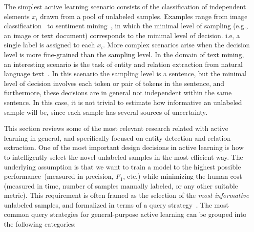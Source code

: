 The simplest active learning scenario consists of  the classification of independent elements $x_i$ drawn from a pool of unlabeled samples.
Examples range from image classification~\cite{Gal2017DeepBA} to sentiment mining~\cite{Kranjc2015ActiveLF},  in which the minimal level of sampling (e.g., an image or text document) corresponds to the minimal level of decision. i.e, a single label is assigned to each $x_i$. More complex scenarios arise when the decision level is more fine-grained than the sampling level. In the domain of text mining, an interesting scenario is the task of entity and relation extraction from natural language text~\cite{zhang2012unified}.
In this scenario the sampling level is a sentence, but the minimal level of decision involves each token or pair of tokens in the sentence, and furthermore, these decisions are in general not independent within the same sentence.
In this case, it is not trivial to estimate how informative an unlabeled sample will be, since each sample has several sources of uncertainty.

This section reviews some of the most relevant research related with active learning in general, and specifically focused on entity detection and relation extraction.
One of the most important design decisions in active learning is how to intelligently select the novel unlabeled samples in the most efficient way. The underlying assumption is that we want to train a
model to the highest possible performance~(measured in precision, $F_1$, etc.) while minimizing the human cost (measured in time, number of samples manually labeled, or any other suitable metric).
This requirement is often framed as the selection of the \textit{most informative} unlabeled samples, and formalized in terms of a query strategy~\cite{survey}.
The most common query strategies for general-purpose active learning can be grouped into the following categories:

